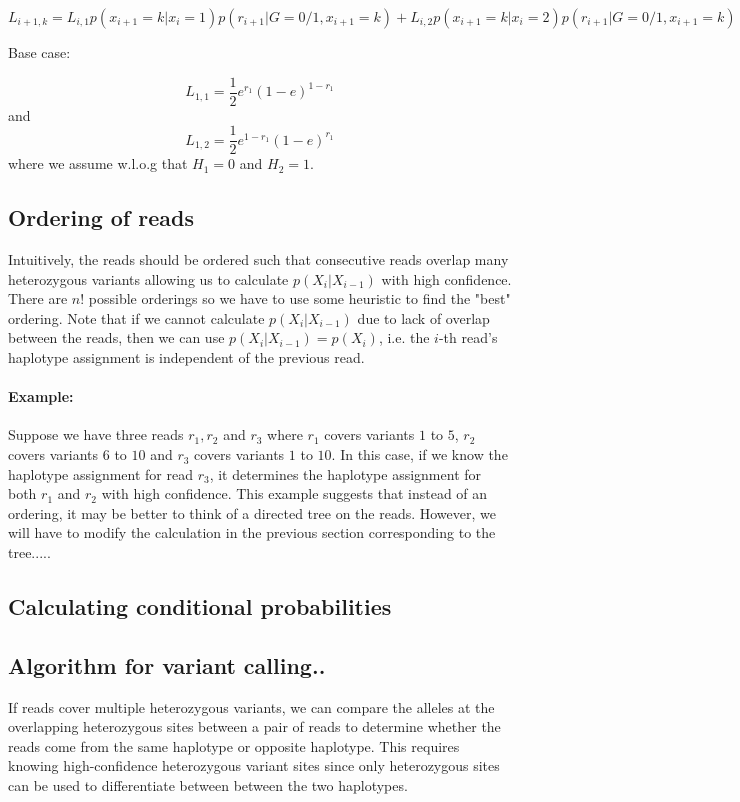 \documentclass[9pt]{osa-supplemental-document}
\begin{document}
\[ L_{i+1,k} = L_{i,1} p(x_{i+1} = k | x_i = 1) p(r_{i+1}|G=0/1,x_{i+1} = k) + L_{i,2} p(x_{i+1} = k | x_i = 2)p(r_{i+1}|G=0/1,x_{i+1} = k) \] 

Base case:

\[ L_{1,1} = \frac{1}{2}e^{r_1}{(1-e)}^{1-r_1}\] and \[L_{1,2} = \frac{1}{2}e^{1-r_1}{(1-e)}^{r_1}\]
where we assume w.l.o.g that $H_1 = 0$ and $H_2=1$. 

\subsection{Ordering of reads}

Intuitively, the reads should be ordered such that consecutive reads overlap many heterozygous variants allowing us to calculate $p(X_i|X_{i-1})$ with high confidence. There are $n!$ possible orderings so we have to use some heuristic to find the "best" ordering.
Note that if we cannot calculate $p(X_i|X_{i-1})$ due to lack of overlap between the reads, then we can use $p(X_i|X_{i-1}) = p(X_i)$, i.e. the $i$-th read's haplotype assignment is independent of the previous read. 

\paragraph{Example:}
Suppose we have three reads $r_1, r_2$ and $r_3$ where $r_1$ covers variants $1$ to $5$, $r_2$ covers variants $6$ to $10$ and $r_3$ covers variants $1$ to $10$. In this case, if we know the haplotype assignment for read $r_3$, it determines the haplotype assignment for both $r_1$ and $r_2$ with high confidence. This example suggests that instead of an ordering, it may be better to think of a directed tree on the reads. However, we will have to modify the calculation in the previous section corresponding to the tree.....


\subsection{Calculating conditional probabilities}


\subsection{Algorithm for variant calling..}

If reads cover multiple heterozygous variants, we can compare the alleles at the overlapping heterozygous sites between a pair of reads to determine whether the reads come from the same haplotype or opposite haplotype. This requires knowing high-confidence heterozygous variant sites since only heterozygous sites can be used to differentiate between between the two haplotypes. 
\end{document}
